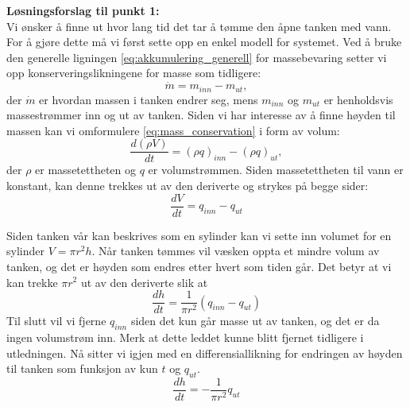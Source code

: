 \textbf{Løsningsforslag til punkt 1:} \\
Vi ønsker å finne ut hvor lang tid det tar å tømme den åpne tanken med vann. For å gjøre dette må vi først sette opp en enkel modell for systemet. Ved å bruke den generelle ligningen \cref{eq:akkumulering_generell} for massebevaring setter vi opp konserveringslikningene for masse som tidligere:
\begin{equation}
    \dot{m} = m_{inn} - m_{ut},
    \label{eq:mass_conservation}
\end{equation}
der $\dot{m}$ er hvordan massen i tanken endrer seg, mens $m_{inn}$ og $m_{ut}$ er henholdsvis massestrømmer inn og ut av tanken. Siden vi har interesse av å finne høyden til massen kan vi omformulere \eqref{eq:mass_conservation} i form av volum:
\begin{equation}
    \frac{d (\rho V)}{dt} = (\rho q)_{inn} - (\rho q)_{ut},
\end{equation}
der $\rho$ er massetettheten og $q$ er volumstrømmen. Siden massetettheten til vann er konstant, kan denne trekkes ut av den deriverte og strykes på begge sider:
\begin{equation}
    \frac{dV}{dt} = q_{inn} - q_{ut}
\end{equation}

Siden tanken vår kan beskrives som en sylinder kan vi sette inn volumet for en sylinder $V=\pi r^2h$. Når tanken tømmes vil væsken oppta et mindre volum av tanken, og det er høyden som endres etter hvert som tiden går. Det betyr at vi kan trekke $\pi r^2$ ut av den deriverte slik at
\begin{equation}
    \frac{dh}{dt} = \frac{1}{\pi r^2}(q_{inn} - q_{ut})
\end{equation}
Til slutt vil vi fjerne $q_{inn}$ siden det kun går masse ut av tanken, og det er da ingen volumstrøm inn. Merk at dette leddet kunne blitt fjernet tidligere i utledningen. Nå sitter vi igjen med en differensiallikning for endringen av høyden til tanken som funksjon av kun $t$ og $q_{ut}$. 
\begin{equation}
    \frac{dh}{dt} = -\frac{1}{\pi r^2} q_{ut}
    \label{eq:dh_dt_non_closed}
\end{equation}


